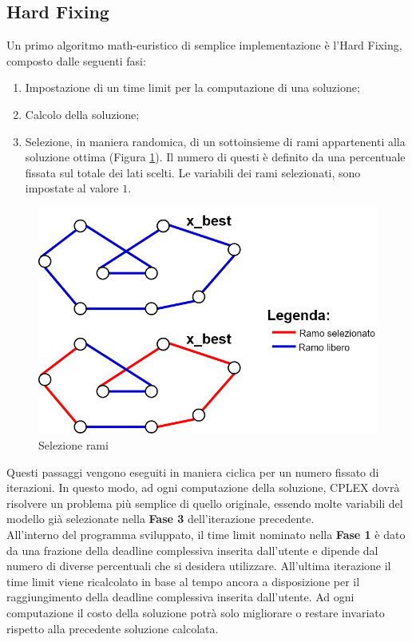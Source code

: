 \subsection{Hard Fixing}\label{hard fixing}
Un primo algoritmo math-euristico di semplice implementazione è l'Hard Fixing, composto dalle seguenti fasi:
\begin{enumerate}
\item{Impostazione di un time limit per la computazione di una soluzione;}
\item{Calcolo della soluzione;}
\item{Selezione, in maniera randomica, di un sottoinsieme di rami appartenenti alla soluzione ottima (Figura \ref{selezione_rami}). 
Il numero di questi è definito da una percentuale fissata sul totale dei lati scelti. Le variabili dei rami selezionati, sono impostate al valore $1$.}
\end{enumerate}
\begin{figure}[h] 
\begin{center} 
  \includegraphics[scale=0.38]{Images/x_best} 
  \caption{\footnotesize{Selezione rami}}
  \label{selezione_rami} 
\end{center} 
\end{figure}
Questi passaggi vengono eseguiti in maniera ciclica per un numero fissato di iterazioni. In questo modo, ad ogni computazione della soluzione, CPLEX dovrà risolvere un problema più semplice di quello originale, essendo molte variabili del modello già selezionate nella \textbf{Fase 3} dell'iterazione precedente.\\
All'interno del programma sviluppato, il time limit nominato nella \textbf{Fase 1} è dato da una frazione della deadline complessiva inserita dall'utente e dipende dal numero di diverse percentuali che si desidera utilizzare. All'ultima iterazione il time limit viene ricalcolato in base al tempo ancora a disposizione per il raggiungimento della deadline complessiva inserita dall'utente. Ad ogni computazione il costo della soluzione potrà solo migliorare o restare invariato rispetto alla precedente soluzione calcolata.\\
